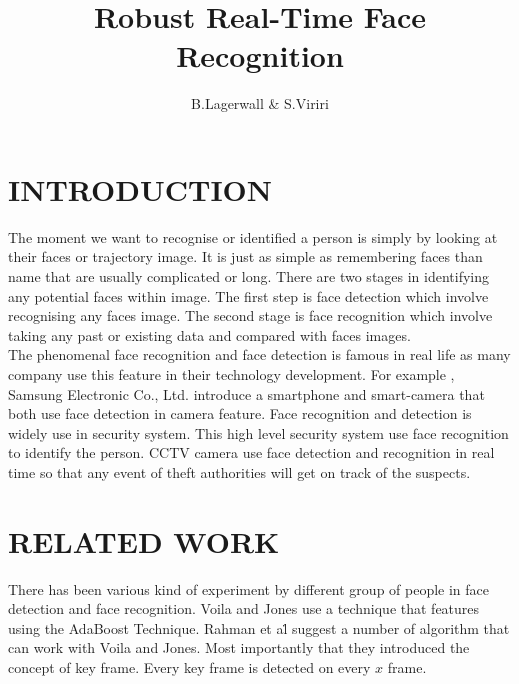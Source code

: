 \documentclass[a4paper,11pt]{article}
\title{Robust Real-Time Face Recognition}
\author{B.Lagerwall & S.Viriri}
\begin{document}
\maketitle
\tableofcontents 
\newpage
{}
\section{INTRODUCTION}
\hspace{1cm}The moment we want to recognise or identified a person  is simply by looking at their faces or trajectory image. It is just as simple as remembering faces than name that are usually complicated or long. There are two stages in identifying any potential faces within image. The first step is face detection which involve recognising any faces image. The second stage is face recognition which involve taking any past or existing data and compared with faces images.\\
 
\hspace{1cm}The phenomenal face recognition and face detection is famous in real life as many company use this feature in their technology development. For example , Samsung Electronic Co., Ltd. introduce a smartphone and smart-camera that both use face detection in camera feature. Face recognition and detection is widely use in security system. This high level security system use face recognition to identify the person. CCTV camera use face detection and recognition in real time so that any event of theft authorities will get on track of the suspects.

\section{RELATED WORK}
\hspace{1cm}There has been various kind of experiment by different group of people in face detection and face recognition.  Voila and Jones use a technique that features using the AdaBoost Technique. Rahman et a\.l suggest a number of algorithm that can work with Voila and Jones. Most importantly that they introduced the concept of key frame. Every key frame is detected on every $x$ frame.\\
\end{document}
